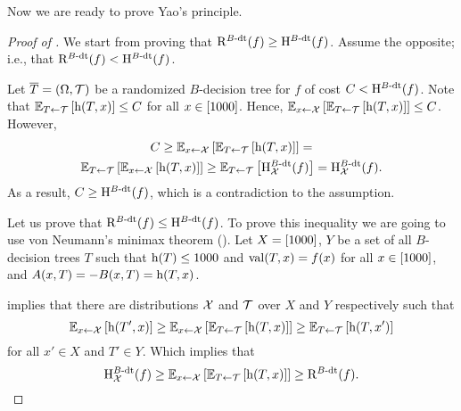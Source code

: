 Now we are ready to prove Yao's principle.
\begin{proof}[Proof of ]
  We start from proving that $\mathrm{R}^{B\text{-}\mathrm{dt}}({f}) \ge \mathrm{H}_{ }^{B\text{-}\mathrm{dt}}({f})$. Assume the
  opposite; i.e., that $\mathrm{R}^{B\text{-}\mathrm{dt}}({f}) < \mathrm{H}_{ }^{B\text{-}\mathrm{dt}}({f})$. 
  
  
  Let $\overline{T} = (\Omega, \mathcal{T})$ be a randomized $B$-decision tree
  for $f$ of cost $C < \mathrm{H}_{ }^{B\text{-}\mathrm{dt}}({f})$. Note that 
  $\expectation[T \gets \Distribution{T}]{\DTHeight[x]{T}} \le C$ for all $x \in
  {[{1000}]}$. Hence, 
  $\expectation[x \gets \Distribution{X}]{
    \expectation[T \gets \Distribution{T}]{\DTHeight[x]{T}}
  } \le C$. However, 
  \begin{multline*}
    C \ge 
    \expectation[x \gets \Distribution{X}]{
      \expectation[T \gets \Distribution{T}]{\DTHeight[x]{T}}
    } = \\
    \expectation[T \gets \Distribution{T}]{
      \expectation[x \gets \Distribution{X}]{\DTHeight[x]{T}}
    } \ge
    \expectation[T \gets \Distribution{T}]{
      \HeurCBDT[\Distribution{X}]{f}
    } = \HeurCBDT[\Distribution{X}]{f}.
  \end{multline*}
  As a result, $C \ge \mathrm{H}_{ }^{B\text{-}\mathrm{dt}}({f})$, which is a contradiction to the assumption.


  Let us prove that $\mathrm{R}^{B\text{-}\mathrm{dt}}({f}) \le \mathrm{H}_{ }^{B\text{-}\mathrm{dt}}({f})$. To prove this inequality we
  are going to use von Neumann's minimax theorem ().
  Let $X = {[{1000}]}$, $Y$ be a set of all $B$-decision trees $T$ such that
  $\DTHeight{T} \le 1000$ and $\mathrm{val}({T}, {x}) = f(x)$ for all $x \in
  {[{1000}]}$, and $A(x, T) = - B(x, T) = \DTHeight[x]{T}$.

   implies that there are distributions
  $\mathcal{X}$ and $\mathcal{T}$ over $X$ and $Y$ respectively such
  that 
  \[
    \expectation[x \gets \Distribution{X}]{\DTHeight[x]{T'}} \ge 
    \expectation[x \gets \Distribution{X}]{
      \expectation[T \gets \Distribution{T}]{\DTHeight[x]{T}}
    } \ge 
    \expectation[T \gets \Distribution{T}]{\DTHeight[x']{T}}
  \]
  for all $x' \in X$ and $T' \in Y$. Which implies that 
  \[
    \HeurCBDT[\Distribution{X}]{f} \ge 
    \expectation[x \gets \Distribution{X}]{
      \expectation[T \gets \Distribution{T}]{\DTHeight[x]{T}}
    } \ge \RandCBDT{f}.
  \]
\end{proof}
